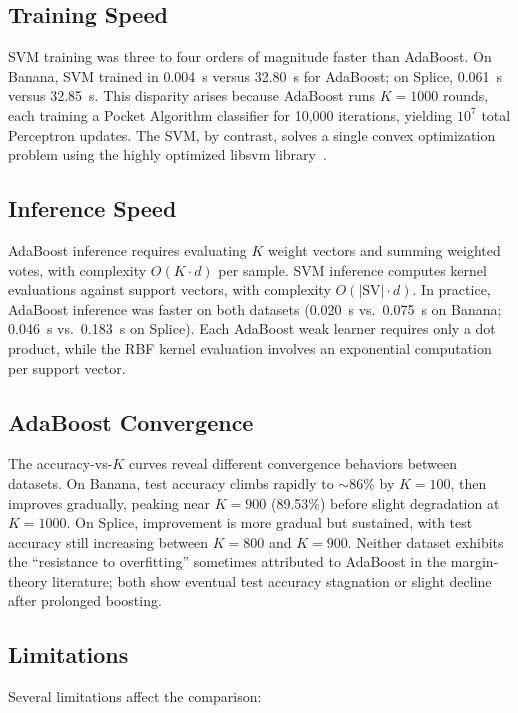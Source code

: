 \documentclass{acm_proc_article-sp}
\begin{document}
\subsection{Training Speed}

SVM training was three to four orders of magnitude faster than AdaBoost. On Banana, SVM trained in 0.004~s versus 32.80~s for AdaBoost; on Splice, 0.061~s versus 32.85~s. This disparity arises because AdaBoost runs $K=1000$ rounds, each training a Pocket Algorithm classifier for 10,000 iterations, yielding $10^7$ total Perceptron updates. The SVM, by contrast, solves a single convex optimization problem using the highly optimized libsvm library~\cite{chang2011}.

\subsection{Inference Speed}

AdaBoost inference requires evaluating $K$ weight vectors and summing weighted votes, with complexity $O(K \cdot d)$ per sample. SVM inference computes kernel evaluations against support vectors, with complexity $O(|\text{SV}| \cdot d)$. In practice, AdaBoost inference was faster on both datasets (0.020~s vs.\ 0.075~s on Banana; 0.046~s vs.\ 0.183~s on Splice). Each AdaBoost weak learner requires only a dot product, while the RBF kernel evaluation involves an exponential computation per support vector.

\subsection{AdaBoost Convergence}

The accuracy-vs-$K$ curves reveal different convergence behaviors between datasets. On Banana, test accuracy climbs rapidly to $\sim$86\% by $K=100$, then improves gradually, peaking near $K=900$ (89.53\%) before slight degradation at $K=1000$. On Splice, improvement is more gradual but sustained, with test accuracy still increasing between $K=800$ and $K=900$. Neither dataset exhibits the ``resistance to overfitting'' sometimes attributed to AdaBoost in the margin-theory literature; both show eventual test accuracy stagnation or slight decline after prolonged boosting.

\subsection{Limitations}

Several limitations affect the comparison:
\end{document}
